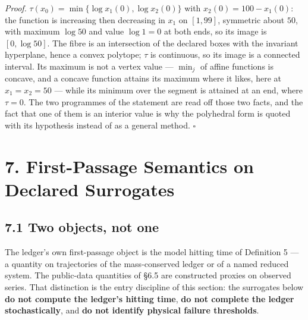 \documentclass[11pt]{article}
\begin{document}
\emph{Proof.} \(\tau(x_0) =\allowbreak{} \min\{\log x_1(0),\allowbreak{} \log x_2(0)\}\) with \(x_2(0) = 100 - x_1(0)\): the function is increasing then decreasing in \(x_1\) on \([1, 99]\), symmetric about \(50\), with maximum \(\log 50\) and value \(\log 1=0\) at both ends, so its image is \([0, \log 50]\). The fibre is an intersection of the declared boxes with the invariant hyperplane, hence a convex polytope; \(\tau\) is continuous, so its image is a connected interval. Its maximum is not a vertex value --- \(\min_j\) of affine functions is concave, and a concave function attains its maximum where it likes, here at \(x_1 = x_2 = 50\) --- while its minimum over the segment is attained at an end, where \(\tau=0\). The two programmes of the statement are read off those two facts, and the fact that one of them is an interior value is why the polyhedral form is quoted with its hypothesis instead of as a general method. \(\square\)

\section*{7. First-Passage Semantics on Declared Surrogates}\label{7-first-passage-semantics-on-declared-surrogates}

\subsection*{7.1 Two objects, not one}\label{71-two-objects-not-one}

The ledger's own first-passage object is the model hitting time of Definition 5 --- a quantity on trajectories of the mass-conserved ledger or of a named reduced system. The public-data quantities of \S6.5 are constructed proxies on observed series. That distinction is the entry discipline of this section: the surrogates below \textbf{do not compute the ledger's hitting time}, \textbf{do not complete the ledger stochastically}, and \textbf{do not identify physical failure thresholds}.
\end{document}
